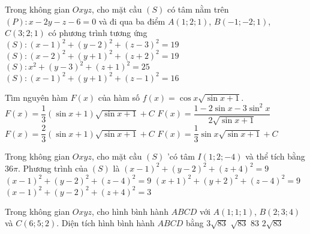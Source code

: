 \begin{ex}%
Trong không gian $ Oxyz $, cho mặt cầu $ (S) $ có tâm nằm trên $ (P):x-2y-z-6=0$ và đi qua ba điểm $ A(1 ; 2 ; 1) $, $ B(-1 ; -2 ; 1) $, $ C(3 ; 2 ; 1) $ có phương trình tương ứng
\choice
{$ (S): (x-1)^2+(y-2)^2+(z-3)^2=19$}
{\True $ (S): (x-2)^2+(y+1)^2+(z+2)^2=19$}
{$ (S): x^2+(y-3)^2+(z+1)^2=25$}
{$ (S): (x-1)^2+(y+1)^2+(z-1)^2=16$}
\end{ex}

\begin{ex}%
Tìm nguyên hàm $F(x)$ của hàm số $f(x)=\cos x\sqrt{\sin x+1}$.
\choice
{$F(x)=\dfrac{1}{3}(\sin x+1)\sqrt{\sin x+1}+C$}
{$F(x)=\dfrac{1-2\sin x-3\sin^2 x}{2\sqrt{\sin x+1}}$}
{\True $F(x)=\dfrac{2}{3}(\sin x+1)\sqrt{\sin x+1}+C$}
{$F(x)=\dfrac{1}{3}\sin x\sqrt{\sin x+1}+C$}
\end{ex}

\begin{ex}%
Trong không gian $O x y z$, cho mặt cầu $(S)$ 'có tâm $I(1 ; 2 ;-4)$ và thể tích bằng $36 \pi$. Phương trình của $(S)$ là
\choice
{\True $(x-1)^{2}+(y-2)^{2}+(z+4)^{2}=9$}
{$(x-1)^{2}+(y-2)^{2}+(z-4)^{2}=9$}
{$(x+1)^{2}+(y+2)^{2}+(z-4)^{2}=9$}
{$(x-1)^{2}+(y-2)^{2}+(z+4)^{2}=3$}
\end{ex}

\begin{ex}%
Trong không gian $Oxyz$, cho hình bình hành  $ABCD$ với  $A(1;1;1)$, $B(2;3;4)$ và $C(6;5;2)$. Diện tích hình bình hành $ABCD$  bằng \choice
{$3\sqrt{83} $}
{$\sqrt{83} $}
{$ 83 $}
{\True $2\sqrt{83}$}
\end{ex}

